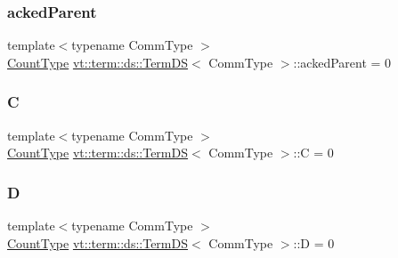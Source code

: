 \subsubsection{\texorpdfstring{acked\+Parent}{ackedParent}}
{\footnotesize\ttfamily template$<$typename Comm\+Type $>$ \\
\hyperlink{structvt_1_1term_1_1ds_1_1_term_d_s_a54f4ebd7e1ecb59c32c0f5b03ef9f20b}{Count\+Type} \hyperlink{structvt_1_1term_1_1ds_1_1_term_d_s}{vt\+::term\+::ds\+::\+Term\+DS}$<$ Comm\+Type $>$\+::acked\+Parent = 0\hspace{0.3cm}{\ttfamily [protected]}}

\mbox{\label{structvt_1_1term_1_1ds_1_1_term_d_s_a5d909caa14a0da42d9809d83e0f79f40}} 
\subsubsection{\texorpdfstring{C}{C}}
{\footnotesize\ttfamily template$<$typename Comm\+Type $>$ \\
\hyperlink{structvt_1_1term_1_1ds_1_1_term_d_s_a54f4ebd7e1ecb59c32c0f5b03ef9f20b}{Count\+Type} \hyperlink{structvt_1_1term_1_1ds_1_1_term_d_s}{vt\+::term\+::ds\+::\+Term\+DS}$<$ Comm\+Type $>$\+::C = 0\hspace{0.3cm}{\ttfamily [protected]}}

\mbox{\label{structvt_1_1term_1_1ds_1_1_term_d_s_afcfe54a5e5844f7483cd730c9970fe36}} 
\subsubsection{\texorpdfstring{D}{D}}
{\footnotesize\ttfamily template$<$typename Comm\+Type $>$ \\
\hyperlink{structvt_1_1term_1_1ds_1_1_term_d_s_a54f4ebd7e1ecb59c32c0f5b03ef9f20b}{Count\+Type} \hyperlink{structvt_1_1term_1_1ds_1_1_term_d_s}{vt\+::term\+::ds\+::\+Term\+DS}$<$ Comm\+Type $>$\+::D = 0\hspace{0.3cm}{\ttfamily [protected]}}

\mbox{\label{structvt_1_1term_1_1ds_1_1_term_d_s_ad8d11aea5b48de393ba6f94c0ce8ed7e}} 
